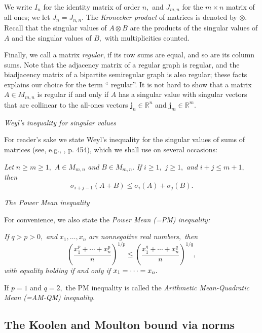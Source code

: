 \documentclass[12pt]{article}%
\begin{document}
We write $I_{n}$ for the identity matrix of order $n,$ and $J_{m,n}$ for the
$m\times n$ matrix of all ones; we let $J_{n}=J_{n,n}.$ The \emph{Kronecker
product} of matrices is denoted by $\otimes.$ Recall that the singular values
of $A\otimes B$ are the products of the singular values of $A$ and the
singular values of $B,$ with multiplicities counted.\medskip

Finally, we call a matrix \emph{regular}, if its row sums are equal, and so
are its column sums. Note that the adjacency matrix of a regular graph is
regular, and the biadjacency matrix of a bipartite semiregular graph is also
regular; these facts explains our choice for the term \textquotedblleft
regular\textquotedblright. It is not hard to show that a matrix $A\in M_{m,n}$
is regular if and only if $A$ has a singular value with singular vectors that
are collinear to the all-ones vectors $\mathbf{j}_{n}\in\mathbb{R}^{n}$ and
$\mathbf{j}_{m}\in\mathbb{R}^{m}$.\medskip

\emph{Weyl's inequality for singular values\medskip}

For reader's sake we state Weyl's inequality for the singular values of sums
of matrices (see, e.g., \cite{HoJo12}, p. 454), which we shall use on several
occasions:\medskip

\emph{Let }$n\geq m\geq1,$ $A\in M_{m,n}$\emph{ and }$B\in M_{m,n}.$\emph{ If
}$i\geq1,$\emph{ }$j\geq1,$\emph{ and }$i+j\leq m+1,$\emph{ then}%
\begin{equation}
\sigma_{i+j-1}\left(  A+B\right)  \leq\sigma_{i}\left(  A\right)  +\sigma
_{j}\left(  B\right)  . \label{Wsin}%
\end{equation}


\emph{The Power Mean inequality}\textbf{\medskip}

For convenience, we also state the \emph{Power Mean (=PM) inequality:}\medskip

\emph{If }$q>p>0,$\emph{ and }$x_{1},\ldots,x_{n}$\emph{ are nonnegative real
numbers}$,$\emph{ then}%
\[
\left(  \frac{x_{1}^{p}+\cdots+x_{n}^{p}}{n}\right)  ^{1/p}\leq\left(
\frac{x_{1}^{q}+\cdots+x_{n}^{q}}{n}\right)  ^{1/q},
\]
\emph{with equality holding if and only if }$x_{1}=\cdots=x_{n}.\medskip$

If $p=1$ and $q=2,$ the PM inequality is called the \emph{Arithmetic
Mean-Quadratic Mean (=AM-QM) inequality}.

\subsection{\label{KMn}The Koolen and Moulton bound via norms}
\end{document}
